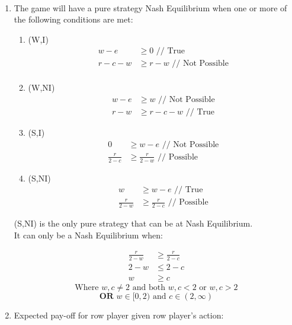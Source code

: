 \documentclass[12pt]{article}
\newenvironment{solution}[2][Solution]{\begin{trivlist}
\item[\hskip \labelsep {\bfseries #1}]}{\end{trivlist}}
\begin{document}
\begin{solution}{}~\\
\begin{enumerate}[label=\alph*)]
\item The game will have a pure strategy Nash Equilibrium when one or more of the following conditions are met:\\

\begin{enumerate}[label=(\roman*)]
\item (W,I)\\
\begin{align*}
w-e&\geq0\text{    // True}\\
r-c-w&\geq r-w\text{    // Not Possible}\\
\end{align*}
\item (W,NI)\\
\begin{align*}
w-e&\geq w\text{    // Not Possible}\\
r-w&\geq r-c-w\text{    // True}
\end{align*}
\item (S,I)\\
\begin{align*}
0&\geq w-e\text{    // Not Possible}\\
\frac{r}{2-c}&\geq\frac{r}{2-w}\text{    // Possible}
\end{align*}
\item (S,NI)\\
\begin{align*}
w&\geq w-e\text{    // True}\\
\frac{r}{2-w}&\geq\frac{r}{2-c}\text{    // Possible}
\end{align*}
\end{enumerate}
(S,NI) is the only pure strategy that can be at Nash Equilibrium.\\
It can only be a Nash Equilibrium when:\\

\begin{align*}
\frac{r}{2-w}&\geq\frac{r}{2-c}\\
2-w&\leq2-c\\
w&\geq c
\end{align*}
$$\text{Where }w,c\neq2\text{ and both }w,c<2\text{ or }w,c>2$$
$$\textbf{OR }w\in[0,2)\text{ and }c\in(2,\infty)$$
\item Expected pay-off for row player given row player's action:\\


\end{enumerate}
\end{solution}
\end{document}
